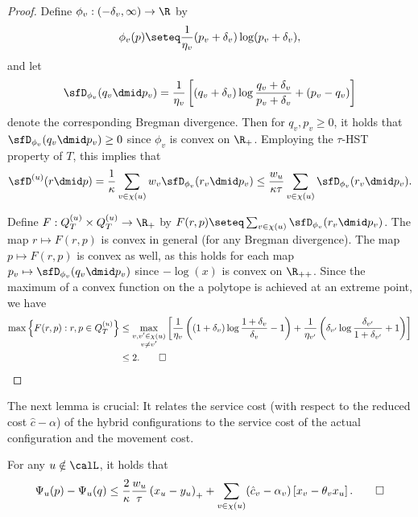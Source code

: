\begin{proof}
	Define $\phi_v : (-\delta_v,\infty) \to \R$ by
	\[
	\phi_v(p) \seteq \frac{1}{\eta_v} (p_v+\delta_v) \log (p_v+\delta_v),
	\]
	and let
	\[
	\sfD_{\phi_v}(q_v \dmid p_v) = \frac{1}{\eta_v} \left[(q_v+\delta_v) \log \frac{q_v+\delta_v}{p_v+\delta_v} + (p_v-q_v)\right]
	\]
	denote the corresponding Bregman divergence.
	Then for $q_v,p_v \geq 0$, it holds that $\sfD_{\phi_v}(q_v \dmid p_v) \geq 0$ since $\phi_v$ is convex on $\R_+$.
	Employing the $\tau$-HST property of $T$, this implies that
	\[
	\sfD^{(u)}(r \dmid p) = \frac{1}{\kappa} \sum_{v \in \chi(u)} w_v \sfD_{\phi_v}(r_v \dmid p_v) \leq
	\frac{w_u}{\kappa \tau} \sum_{v \in \chi(u)} \sfD_{\phi_v}(r_v \dmid p_v).
	\]
	
	Define $F : Q^{(u)}_T \times Q^{(u)}_T \to \R_+$ by $F(r,p) \seteq\sum_{v \in \chi(u)} \sfD_{\phi_v}(r_v \dmid p_v)$.
	The map $r \mapsto F(r,p)$ is convex in general (for any Bregman divergence).
	The map $p \mapsto F(r,p)$ is convex as well, as this holds for each map $p_v \mapsto \sfD_{\phi_v}(q_v \dmid p_v)$
	since $-\log(x)$ is convex on $\R_{++}$.
	Since the maximum of a convex function on the a polytope is achieved at an extreme point, we have
	\begin{align*}
	\max \left\{ F(r,p) :r,p \in Q^{(u)}_T \right\} &\leq \max_{\substack{v,v' \in \chi(u) \\ v \neq v'}} 
	\left[
	\frac{1}{\eta_v} \left((1+\delta_v) \log \frac{1+\delta_v}{\delta_v} -1\right)
	+ \frac{1}{\eta_{v'}} \left(\delta_{v'} \log \frac{\delta_{v'}}{1+\delta_{v'}} +1\right)\right]
	\\
	&\leq 2.\qedhere
	\end{align*}
\end{proof}

The next lemma is crucial: It relates the service cost (with respect to the reduced cost $\hat{c}-\alpha$) of the hybrid configurations to the service cost of the actual configuration and the movement cost.
\begin{lemma}
   \label{lem:crucial}
	For any $u \notin \calL$, it holds that
	\begin{equation}\label{eq:hybrid}
	\Psi_u(p) - \Psi_u(q) \leq \frac{2}{\kappa} \frac{w_u}{\tau} \left(x_u-y_u\right)_+ + 
	\sum_{v \in \chi(u)} (\hat{c}_v-\alpha_v) \left[x_v - \theta_v x_u\right].\qedhere
	\end{equation}
\end{lemma}

